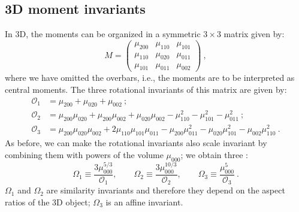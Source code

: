 \subsection{3D moment invariants}
In 3D, the moments can be organized in a symmetric $3\times 3$ matrix given by:
\[
	M = \begin{pmatrix}\mu_{200}& \mu_{110} & \mu_{101}\\ \mu_{110} & \mu_{020}&\mu_{011}\\
	\mu_{101}&\mu_{011}&\mu_{002}\end{pmatrix}\ ,
\]
where we have omitted the overbars, i.e., the moments are to be interpreted as central moments. The three rotational invariants of this matrix are given by:
\begin{equation}
\begin{split}
	\mathcal{O}_1 &= \mu_{200}+\mu_{020}+\mu_{002}\ ;\\
	\mathcal{O}_2 &= \mu_{200}\mu_{020}+\mu_{200}\mu_{002}+\mu_{020}\mu_{002}-\mu_{110}^2-\mu_{101}^2-\mu_{011}^2\ ;\\
	\mathcal{O}_3 &= \mu_{200}\mu_{020}\mu_{002}+2\mu_{110}\mu_{101}\mu_{011}-\mu_{200}\mu_{011}^2-\mu_{020}\mu_{101}^2
	-\mu_{002}\mu_{110}^2\ .
\end{split}
\end{equation}
As before, we can make the rotational invariants also scale invariant by combining them with powers of the volume $\mu_{000}$; we obtain three :
\begin{equation}
	\Omega_1\equiv\frac{3\mu_{000}^{5/3}}{\mathcal{O}_1},\qquad\Omega_2\equiv\frac{3\mu_{000}^{10/3}}{\mathcal{O}_2},\qquad\Omega_3\equiv\frac{\mu_{000}^{5}}{\mathcal{O}_3}\ .
\end{equation}
$\Omega_1$ and $\Omega_2$ are similarity invariants and therefore they depend on the aspect ratios of the 3D object; $\Omega_3$ is an affine invariant.  

